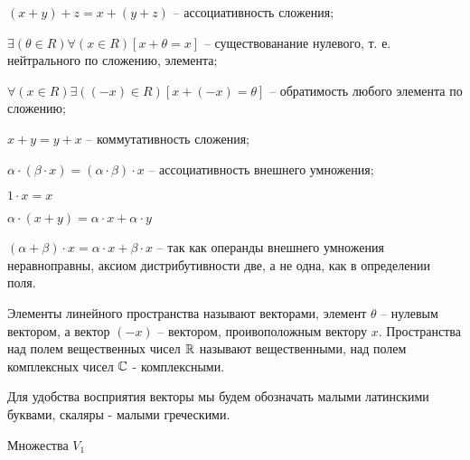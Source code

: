 \begin{list}{.}{}
\item
$(x+y)+z=x+(y+z)$ -- ассоциативность сложения;
\item
$\exists(\theta\in R)\forall(x\in R)[x+\theta=x]$ -- существованание нулевого, т. е. нейтрального по сложению, элемента;
\item
$\forall(x\in R)\exists((-x)\in R)[x+(-x)=\theta]$ -- обратимость любого элемента по сложению;
\item
$x+y=y+x$ -- коммутативность сложения;
\item
$\alpha\cdot(\beta\cdot x)=(\alpha\cdot\beta)\cdot x$ -- ассоциативность внешнего умножения;
\item
$1\cdot x=x$
\item
$\alpha\cdot(x+y)=\alpha\cdot x + \alpha\cdot y$
\item
$(\alpha+\beta)\cdot x = \alpha\cdot x + \beta \cdot x$ -- так как операнды внешнего умножения неравноправны, аксиом дистрибутивности две, а не одна, как в определении поля.
\end{list}

Элементы линейного пространства называют векторами, элемент $\theta$ -- нулевым вектором, а вектор $(-x)$ -- вектором, проивоположным вектору $x$. Пространства над полем вещественных чисел $\mathbb{R}$ называют вещественными, над полем комплексных чисел $\mathbb{C}$ - комплексными.

Для удобства восприятия векторы мы будем обозначать малыми латинскими буквами, скаляры - малыми греческими. 

\begin{primer}
Множества $V_1$
\end{primer}
